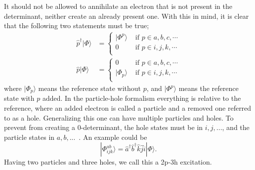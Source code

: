 It should not be allowed to annihilate an electron that is not present in the determinant, neither create an already present one.
With this in mind, it is clear that the following two statements must be true;
\begin{equation}
\label{eq:manybody:particlehole}
\begin{split}
\hat{p}^{\dagger} |\Phi \rangle &=
\left\lbrace
\begin{matrix}
|\Phi^{p} \rangle & \textrm{ if } p \in a,b,c,\cdots \\
0	                & \textrm{ if } p \in i,j,k,\cdots \\
\end{matrix}
\right. 
\\
\hat{p} |\Phi \rangle &=
\left\lbrace
\begin{matrix}
0                   & \textrm{ if } p \in a,b,c,\cdots \\
|\Phi_p \rangle     & \textrm{ if } p \in i,j,k,\cdots  \\
\end{matrix}
\right. 
\end{split}
\end{equation}
where $| \Phi_p \rangle$ means the reference state without $p$, and $| \Phi^p \rangle$ means the reference state with $p$ added.
In the particle-hole formalism everything is relative to the reference, where
an added electron is called a particle and a removed one referred to as a hole.
Generalizing this one can have multiple particles and holes. 
To prevent from creating a $0$-determinant, the hole states must be in $i,j,...$, and the particle states in $a,b,...$~.
An example could be
\begin{equation}
|\Phi_{ijk}^{ab} \rangle =
\hat{a}^{\dagger} \hat{b}^{\dagger} \hat{k} \hat{j} \hat{i} |\Phi \rangle .
\end{equation}
Having two particles and three holes, we call this a 2p-3h excitation.


